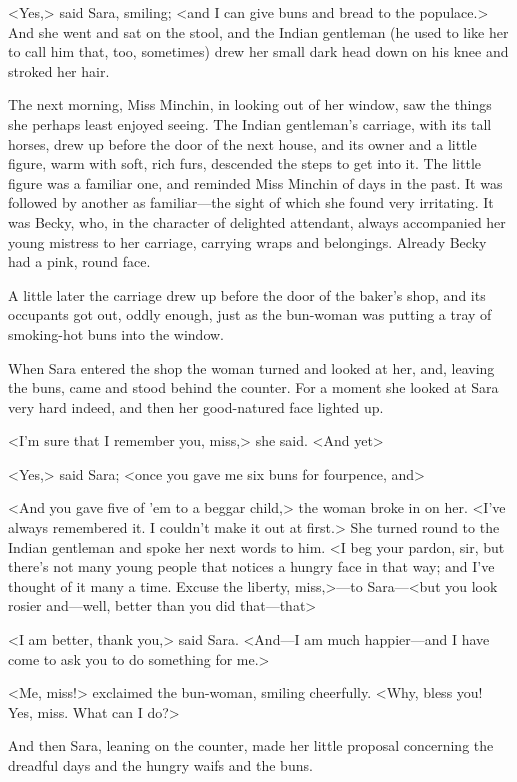 <Yes,> said Sara, smiling; <and I can give buns and bread to the populace.> And she went and sat on the stool, and the Indian gentleman (he used to like her to call him that, too, sometimes) drew her small dark head down on his knee and stroked her hair.

The next morning, Miss Minchin, in looking out of her window, saw the things she perhaps least enjoyed seeing. The Indian gentleman's carriage, with its tall horses, drew up before the door of the next house, and its owner and a little figure, warm with soft, rich furs, descended the steps to get into it. The little figure was a familiar one, and reminded Miss Minchin of days in the past. It was followed by another as familiar—the sight of which she found very irritating. It was Becky, who, in the character of delighted attendant, always accompanied her young mistress to her carriage, carrying wraps and belongings. Already Becky had a pink, round face.

A little later the carriage drew up before the door of the baker's shop, and its occupants got out, oddly enough, just as the bun-woman was putting a tray of smoking-hot buns into the window.

When Sara entered the shop the woman turned and looked at her, and, leaving the buns, came and stood behind the counter. For a moment she looked at Sara very hard indeed, and then her good-natured face lighted up.

<I'm sure that I remember you, miss,> she said. <And yet\longdash>

<Yes,> said Sara; <once you gave me six buns for fourpence, and\longdash>

<And you gave five of 'em to a beggar child,> the woman broke in on her. <I've always remembered it. I couldn't make it out at first.> She turned round to the Indian gentleman and spoke her next words to him. <I beg your pardon, sir, but there's not many young people that notices a hungry face in that way; and I've thought of it many a time. Excuse the liberty, miss,>—to Sara—<but you look rosier and—well, better than you did that—that\longdash>

<I am better, thank you,> said Sara. <And—I am much happier—and I have come to ask you to do something for me.>

<Me, miss!> exclaimed the bun-woman, smiling cheerfully. <Why, bless you! Yes, miss. What can I do?>

And then Sara, leaning on the counter, made her little proposal concerning the dreadful days and the hungry waifs and the buns.

